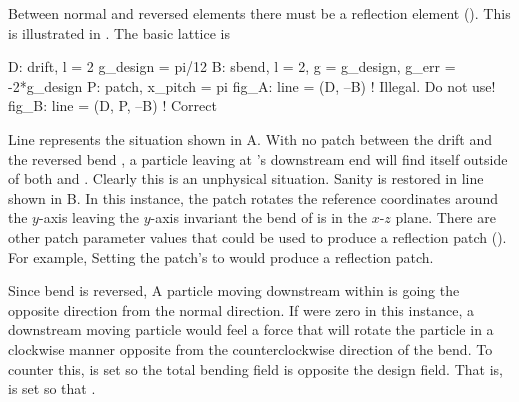 Between normal and reversed elements there must be a reflection
 element ().  This is illustrated in
. The basic lattice is
\begin{example}
  D: drift, l = 2
  g_design = pi/12
  B: sbend, l = 2, g = g_design, g_err = -2*g_design
  P: patch, x_pitch = pi
  fig_A: line = (D, --B)     ! Illegal. Do not use!
  fig_B: line = (D, P, --B)  ! Correct
\end{example}
Line  represents the situation shown in
A.  With no patch between the drift  and
the reversed bend , a particle leaving  at 's
downstream end will find itself outside of both  and
. Clearly this is an unphysical situation. Sanity is restored in
line  shown in B. In this instance, the
patch  rotates the reference coordinates around the $y$-axis
leaving the $y$-axis invariant the bend of  is in the $x$-$z$
plane. There are other patch parameter values that could be used to
produce a reflection patch ().  For example,
Setting the patch's  to  would produce a reflection
patch.

Since bend  is reversed, A particle moving downstream within
 is going the opposite direction from the normal direction. If
 were zero in this instance, a downstream moving particle
would feel a force that will rotate the particle in a clockwise manner
opposite from the counterclockwise direction of the bend. To counter
this,  is set so the total bending field  is opposite the design field. That is,  is set so
that .



